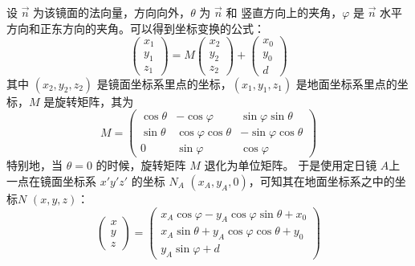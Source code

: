 \documentclass[../main.tex]{subfiles}
\begin{document}
设 \(\vec n\) 为该镜面的法向量，方向向外，\(\theta\) 为 \(\vec n\) 和 竖直方向上的夹角，\(\varphi\) 是 \(\vec n\) 水平方向和正东方向的夹角。可以得到坐标变换的公式：
\begin{equation}
\begin{pmatrix}
x_{1}\\
y_1\\
z_1
\end{pmatrix}
= M
\begin{pmatrix}
x_2\\
y_2\\
z_2
\end{pmatrix} +
\begin{pmatrix}
x_0\\
y_0\\
d
\end{pmatrix}
\end{equation}
其中 \((x_2,y_2,z_2)\) 是镜面坐标系里点的坐标，\((x_1,y_1,z_1)\) 是地面坐标系里点的坐标，\(M\) 是旋转矩阵，其为
\begin{equation}\label{equ:transM}
M =
\begin{pmatrix}
\cos \theta & - \cos \varphi & \sin \varphi \sin \theta\\
\sin \theta & \cos \varphi \cos \theta & - \sin \varphi \cos \theta\\
0 & \sin \varphi & \cos \varphi
\end{pmatrix}
\end{equation}
特别地，当 \(\theta = 0\) 的时候，旋转矩阵 \(M\) 退化为单位矩阵。
于是使用定日镜 \(A\)上一点在镜面坐标系 \(x'y'z'\) 的坐标 \(N_{A}\) \((x_{A}, y_{A},0)\)，可知其在地面坐标系之中的坐标\(N\) \((x, y , z)\)：
\begin{equation}
\begin{pmatrix}
x\\
y\\
z
\end{pmatrix}
=
\begin{pmatrix}
x_{A} \cos \varphi - y_{A} \cos \varphi \sin \theta + x_0\\
x_{A} \sin \theta + y_{A} \cos \varphi \cos \theta + y_{0} \\
y_{A} \sin \varphi + d
\end{pmatrix}
\end{equation}
\end{document}
